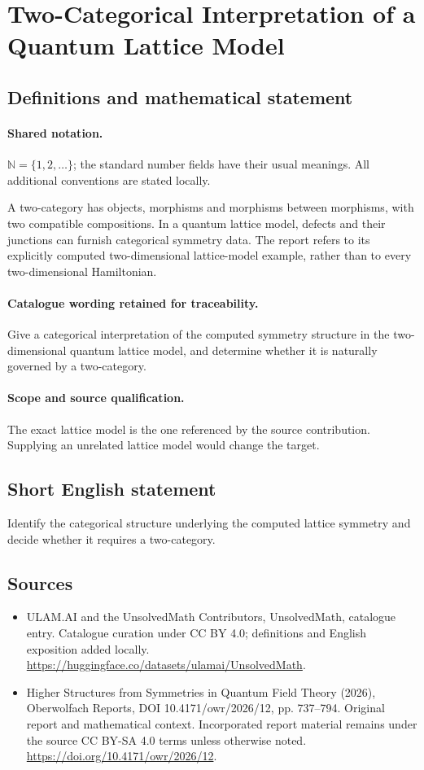 \documentclass[11pt]{article}
\begin{document}
\section{Two-Categorical Interpretation of a Quantum Lattice Model}\label{statement}

\subsection{Definitions and mathematical statement}

\paragraph{Shared notation.}$\mathbb N=\{1,2,\ldots\}$; the standard number fields have their usual meanings. All additional conventions are stated locally.


A two-category has objects, morphisms and morphisms between morphisms, with two compatible compositions. In a quantum lattice model, defects and their junctions can furnish categorical symmetry data. The report refers to its explicitly computed two-dimensional lattice-model example, rather than to every two-dimensional Hamiltonian.

\paragraph{Catalogue wording retained for traceability.}
Give a categorical interpretation of the computed symmetry structure in the two-dimensional quantum lattice model, and determine whether it is naturally governed by a two-category.

\paragraph{Scope and source qualification.}The exact lattice model is the one referenced by the source contribution. Supplying an unrelated lattice model would change the target.
\subsection{Short English statement}
Identify the categorical structure underlying the computed lattice symmetry and decide whether it requires a two-category.
\subsection{Sources}
\begin{itemize}
\item[\hypertarget{source:statement:1}{S1}] ULAM.AI and the UnsolvedMath Contributors, UnsolvedMath, catalogue entry. Catalogue curation under CC BY 4.0; definitions and English exposition added locally.
\url{https://huggingface.co/datasets/ulamai/UnsolvedMath}.
\item[\hypertarget{source:statement:2}{S2}] Higher Structures from Symmetries in Quantum Field Theory (2026), Oberwolfach Reports, DOI 10.4171/owr/2026/12, pp. 737--794. Original report and mathematical context. Incorporated report material remains under the source CC BY-SA 4.0 terms unless otherwise noted.
\url{https://doi.org/10.4171/owr/2026/12}.
\end{itemize}
\label{end:statement}
\end{document}
